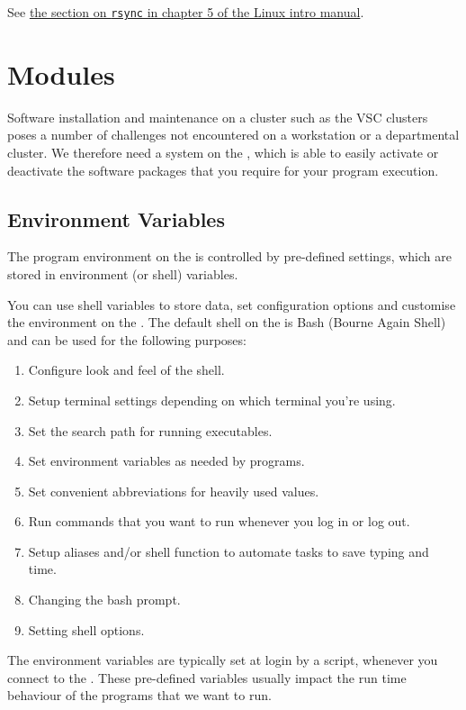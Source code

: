 See \href{\LinuxManualURL#sec:rsync}{the section on \texttt{rsync} in chapter 5 of the Linux intro manual}.

\section{Modules}
\label{sec:modules}
\hypertarget{sec:modules}{}

Software installation and maintenance on a \hpc cluster such as the VSC
clusters poses a number of challenges not encountered on a workstation or a
departmental cluster. We therefore need a system on the \hpc, which is able
to easily activate or deactivate the software packages that you require for
your program execution.

\subsection{Environment Variables}

The program environment on the \hpc is controlled by pre-defined settings,
which are stored in environment (or shell) variables.

You can use shell variables to store data, set configuration options and
customise the environment on the \hpc. The default shell
on the \hpc is Bash (Bourne Again Shell) and can be used for the
following purposes:

\begin{enumerate}
\item  Configure look and feel of the shell.
\item  Setup terminal settings depending on which terminal you're using.
\item  Set the search path for running executables.
\item  Set environment variables as needed by programs.
\item  Set convenient abbreviations for heavily used values.
\item  Run commands that you want to run whenever you log in or log out.
\item  Setup aliases and/or shell function to automate tasks to save typing and time.
\item  Changing the bash prompt.
\item  Setting shell options.
\end{enumerate}

The environment variables are typically set at login by a script, whenever you
connect to the \hpc. These pre-defined variables usually impact the run time
behaviour of the programs that we want to run.

